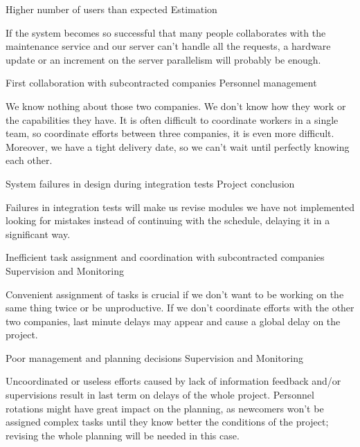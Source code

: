 \begin{risk}{Higher number of users than expected}
\riskcat Estimation

If the system becomes so successful that many people collaborates with the maintenance service and our server can't handle all the requests, a hardware update or an increment on the server parallelism will probably be enough.
\end{risk}

\begin{risk}{First collaboration with subcontracted companies}
\riskcat Personnel management

We know nothing about those two companies. We don't know how they work or the capabilities they have. It is often difficult to coordinate workers in a single team, so coordinate efforts between three companies, it is even more difficult. Moreover, we have a tight delivery date, so we can't wait until perfectly knowing each other.
\end{risk}

\begin{risk}{System failures in design during integration tests}
\riskcat Project conclusion

Failures in integration tests will make us revise modules we have not implemented looking for mistakes instead of continuing with the schedule, delaying it in a significant way.
\end{risk}

\begin{risk}{Inefficient task assignment and coordination with subcontracted companies}
\riskcat Supervision and Monitoring

Convenient assignment of tasks is crucial if we don't want to be working on the same thing twice or be unproductive. If we don't coordinate efforts with the other two companies, last minute delays may appear and cause a global delay on the project.
\end{risk}

\begin{risk}{Poor management and planning decisions}
\riskcat Supervision and Monitoring

Uncoordinated or useless efforts caused by lack of information feedback and/or supervisions result in last term on delays of the whole project. Personnel rotations might have great impact on the planning, as newcomers won't be assigned complex tasks until they know better the conditions of the project; revising the whole planning will be needed in this case.
\end{risk}

